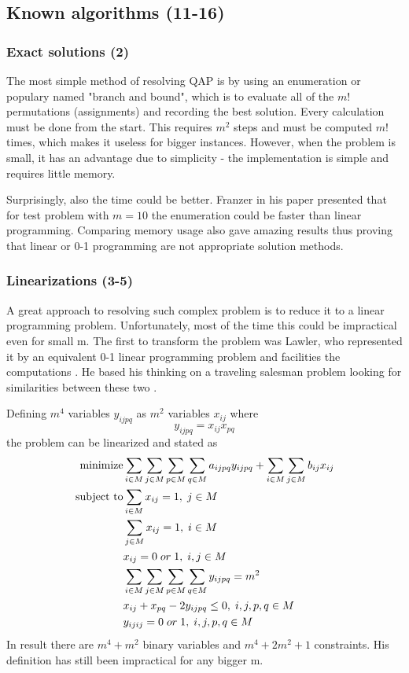 \subsection{Known algorithms (11-16)}
\subsubsection{Exact solutions (2)}

The most simple method of resolving QAP is by using an enumeration or populary named "branch and bound", which is to evaluate all of the $m!$ permutations (assignments) and recording the best solution.
Every calculation must be done from the start.
This requires $m^2$ steps and must be computed $m!$ times, which makes it useless for bigger instances.
However, when the problem is small, it has an advantage due to simplicity - the implementation is simple and requires little memory.

Surprisingly, also the time could be better. Franzer in his paper \cite{frazer1997602} presented that for test problem with $m=10$ the enumeration could be faster than linear programming. Comparing memory usage also gave amazing results thus proving that linear or 0-1 programming are not appropriate solution methods.

\subsubsection{Linearizations (3-5)}
A great approach to resolving such complex problem is to reduce it to a linear programming problem.
Unfortunately, most of the time this could be impractical even for small m.
The first to transform the problem was Lawler, who represented it by an equivalent 0-1 linear programming problem and facilities the computations \cite{lawler1963}. He based his thinking on a traveling salesman problem looking for similarities between these two \cite{charnsethikul1988exact}.

Defining $m^4$ variables $y_{ijpq}$ as $m^2$ variables $x_{ij}$ where
\begin{equation}
y_{ijpq} = x_{ij}x_{pq}
\end{equation}
the problem can be linearized and stated as
\begin{align}
  \text{minimize} &\null \sum_{i \in M} \sum_{j \in M} \sum_{p \in M} \sum_{q \in M} a_{ijpq}y_{ijpq} + \sum_{i \in M} \sum_{j \in M} b_{ij} x_{ij} \\
  \text{subject to} &\null \sum_{i \in M} x_{ij} = 1, \; j \in M \\
  &\null \sum_{j \in M} x_{ij} = 1, \; i \in M \\
  &\null x_{ij} = 0 \; or \; 1, \; i, j \in M \\
  &\null \sum_{i \in M} \sum_{j \in M} \sum_{p \in M} \sum_{q \in M} y_{ijpq} = m^2 \; \\
  &\null x_{ij} + x_{pq} - 2y_{ijpq} \leq 0, \; i, j, p, q \in M \\
  &\null y_{ijij} = 0 \; or \; 1, \; i, j, p, q \in M \\
\end{align}
In result there are $m^4 + m^2$ binary variables and $m^4 + 2 m^2 + 1$ constraints.
His definition has still been impractical for any bigger m.

